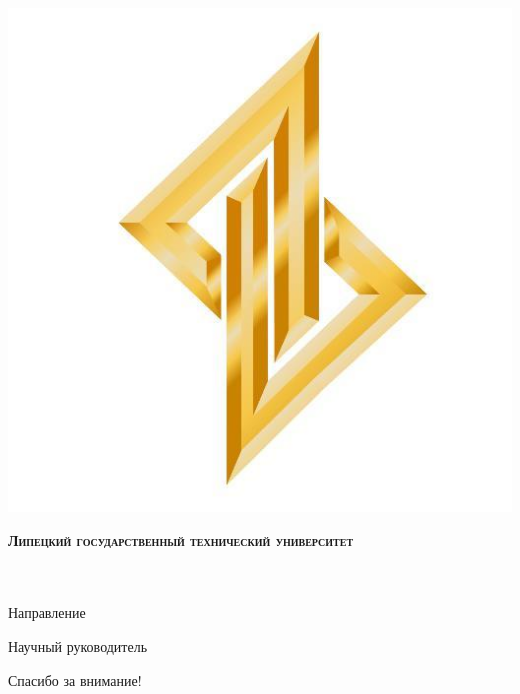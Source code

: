 \documentclass[notheorems,16pt,utf8,fullscreen=true,bookmarks=false]{beamer}
\begin{document}
{
\begin{frame}
		\begin{minipage}[h]{0.1\linewidth}
			\begin{center}
				\includegraphics[scale=0.15]{lstu_logo.jpg}		
			\end{center} 
		\end{minipage}
		\hfill
		\begin{minipage}[h]{0.8\linewidth}
			\begin{center}
				 {\LARGE\scshape\bf Липецкий государственный технический университет}
			\end{center}
		\end{minipage}
			
		\begin{center}
			\large\textbf{\studentIm} \\ 
			\vspace{1cm}
			\thema \\
			\vspace{1cm}
			\normalsize Направление \major \\
		\end{center}
		\vspace{0.5cm}
		\begin{minipage}[h]{0.54\linewidth}
			\begin{center}
				Научный руководитель \\
				\ad 
			\end{center} 
		\end{minipage}
		\hfill
		\begin{minipage}[h]{0.4\linewidth}
		\begin{center}
			\small \adviser
		\end{center}
		\end{minipage}
\end{frame}
}
\normalsize


\begin{frame}
	\begin{center}
		\LARGE Спасибо за внимание!
	\end{center}
\end{frame}
\end{document}
